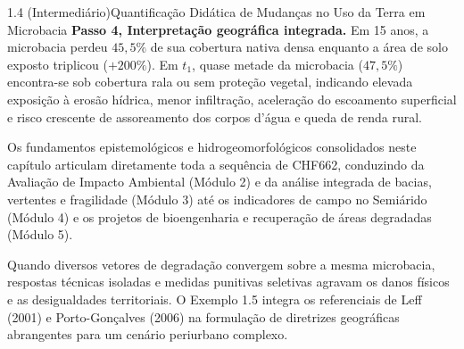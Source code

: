 \begin{boxExemplo}{1.4 (Intermediário)}{Quantificação Didática de Mudanças no Uso da Terra em Microbacia}
{\textbf{Passo 4, Interpretação geográfica integrada.} Em 15 anos, a microbacia perdeu $45{,}5\%$ de sua cobertura nativa densa enquanto a área de solo exposto triplicou ($+200\%$). Em $t_1$, quase metade da microbacia ($47{,}5\%$) encontra-se sob cobertura rala ou sem proteção vegetal, indicando elevada exposição à erosão hídrica, menor infiltração, aceleração do escoamento superficial e risco crescente de assoreamento dos corpos d'água e queda de renda rural.}
\end{boxExemplo}

Os fundamentos epistemológicos e hidrogeomorfológicos consolidados neste capítulo articulam diretamente toda a sequência de CHF662, conduzindo da Avaliação de Impacto Ambiental (Módulo 2) e da análise integrada de bacias, vertentes e fragilidade (Módulo 3) até os indicadores de campo no Semiárido (Módulo 4) e os projetos de bioengenharia e recuperação de áreas degradadas (Módulo 5).


Quando diversos vetores de degradação convergem sobre a mesma microbacia, respostas técnicas isoladas e medidas punitivas seletivas agravam os danos físicos e as desigualdades territoriais. O Exemplo 1.5 integra os referenciais de Leff (2001) e Porto-Gonçalves (2006) na formulação de diretrizes geográficas abrangentes para um cenário periurbano complexo.

